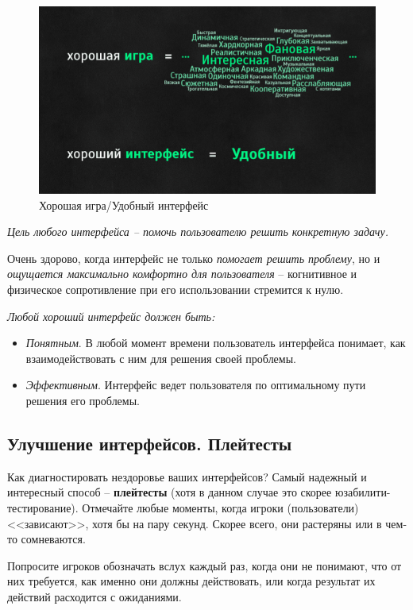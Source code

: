 \documentclass{article}
\begin{document}
\begin{figure}[H]
  \includegraphics[width=\textwidth]{res/img/goodGame.png}
  \caption{Хорошая игра/Удобный интерфейс}
\end{figure}

\textit{Цель любого интерфейса – помочь пользователю решить конкретную задачу.}

Очень здорово, когда интерфейс не только \textit{помогает решить проблему}, но и \textit{ощущается максимально комфортно для пользователя} -- когнитивное и физическое сопротивление при его использовании стремится к нулю.

\bigskip

\noindent\textit{Любой хороший интерфейс должен быть:}
\begin{itemize}
  \item \textit{Понятным}. В любой момент времени пользователь интерфейса понимает, как взаимодействовать с ним для решения своей проблемы.
  \item \textit{Эффективным}. Интерфейс ведет пользователя по оптимальному пути решения его проблемы.
\end{itemize}

\subsection{Улучшение интерфейсов. Плейтесты}
Как диагностировать нездоровье ваших интерфейсов? Самый надежный и интересный способ -- \textbf{плейтесты} (хотя в данном случае это скорее юзабилити-тестирование). Отмечайте любые моменты, когда игроки (пользователи) <<зависают>>, хотя бы на пару секунд. Скорее всего, они растеряны или в чем-то сомневаются.

Попросите игроков обозначать вслух каждый раз, когда они не понимают, что от них требуется, как именно они должны действовать, или когда результат их действий расходится с ожиданиями.
\end{document}
